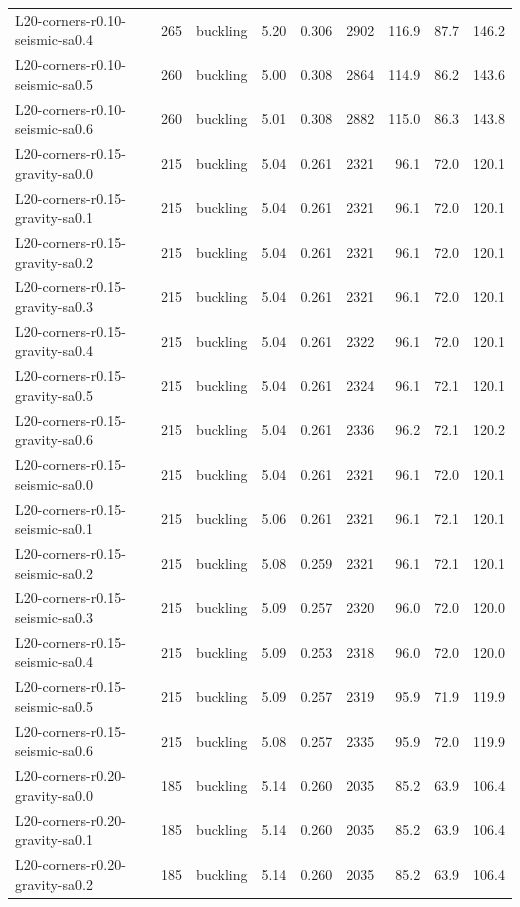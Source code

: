 \begin{tabular}{lrlrrrrrr}
L20-corners-r0.10-seismic-sa0.4 & 265 & buckling & 5.20 & 0.306 & 2902 & 116.9 & 87.7 & 146.2 \\
L20-corners-r0.10-seismic-sa0.5 & 260 & buckling & 5.00 & 0.308 & 2864 & 114.9 & 86.2 & 143.6 \\
L20-corners-r0.10-seismic-sa0.6 & 260 & buckling & 5.01 & 0.308 & 2882 & 115.0 & 86.3 & 143.8 \\
L20-corners-r0.15-gravity-sa0.0 & 215 & buckling & 5.04 & 0.261 & 2321 & 96.1 & 72.0 & 120.1 \\
L20-corners-r0.15-gravity-sa0.1 & 215 & buckling & 5.04 & 0.261 & 2321 & 96.1 & 72.0 & 120.1 \\
L20-corners-r0.15-gravity-sa0.2 & 215 & buckling & 5.04 & 0.261 & 2321 & 96.1 & 72.0 & 120.1 \\
L20-corners-r0.15-gravity-sa0.3 & 215 & buckling & 5.04 & 0.261 & 2321 & 96.1 & 72.0 & 120.1 \\
L20-corners-r0.15-gravity-sa0.4 & 215 & buckling & 5.04 & 0.261 & 2322 & 96.1 & 72.0 & 120.1 \\
L20-corners-r0.15-gravity-sa0.5 & 215 & buckling & 5.04 & 0.261 & 2324 & 96.1 & 72.1 & 120.1 \\
L20-corners-r0.15-gravity-sa0.6 & 215 & buckling & 5.04 & 0.261 & 2336 & 96.2 & 72.1 & 120.2 \\
L20-corners-r0.15-seismic-sa0.0 & 215 & buckling & 5.04 & 0.261 & 2321 & 96.1 & 72.0 & 120.1 \\
L20-corners-r0.15-seismic-sa0.1 & 215 & buckling & 5.06 & 0.261 & 2321 & 96.1 & 72.1 & 120.1 \\
L20-corners-r0.15-seismic-sa0.2 & 215 & buckling & 5.08 & 0.259 & 2321 & 96.1 & 72.1 & 120.1 \\
L20-corners-r0.15-seismic-sa0.3 & 215 & buckling & 5.09 & 0.257 & 2320 & 96.0 & 72.0 & 120.0 \\
L20-corners-r0.15-seismic-sa0.4 & 215 & buckling & 5.09 & 0.253 & 2318 & 96.0 & 72.0 & 120.0 \\
L20-corners-r0.15-seismic-sa0.5 & 215 & buckling & 5.09 & 0.257 & 2319 & 95.9 & 71.9 & 119.9 \\
L20-corners-r0.15-seismic-sa0.6 & 215 & buckling & 5.08 & 0.257 & 2335 & 95.9 & 72.0 & 119.9 \\
L20-corners-r0.20-gravity-sa0.0 & 185 & buckling & 5.14 & 0.260 & 2035 & 85.2 & 63.9 & 106.4 \\
L20-corners-r0.20-gravity-sa0.1 & 185 & buckling & 5.14 & 0.260 & 2035 & 85.2 & 63.9 & 106.4 \\
L20-corners-r0.20-gravity-sa0.2 & 185 & buckling & 5.14 & 0.260 & 2035 & 85.2 & 63.9 & 106.4 \\

\end{tabular}
